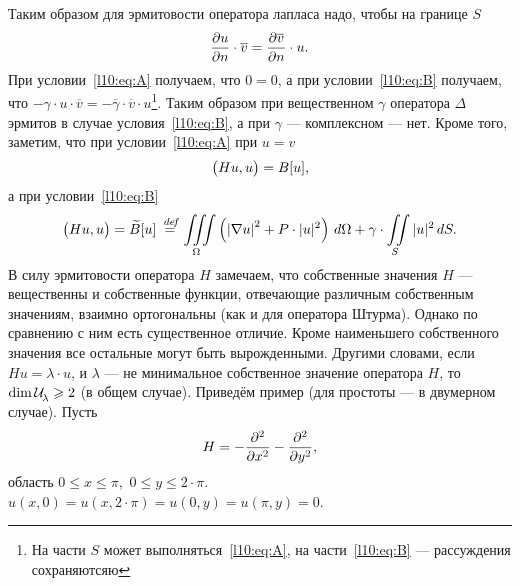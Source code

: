 Таким образом для эрмитовости оператора лапласа надо, чтобы на границе $S$
\begin{equation*}
	\hfill\pder{u}{n}\cdot\overline{v}=\pder{\overline{v}}{n}\cdot u.\hfill
\end{equation*}
При условии~\eqref{l10:eq:A} получаем, что $0=0$, а при условии~\eqref{l10:eq:B} получаем, что $-\gamma\cdot u\cdot\overline{v}=-\overline{\gamma}\cdot\overline{v}\cdot u$\footnote{На части $S$ может выполняться~\eqref{l10:eq:A}, на части~\eqref{l10:eq:B} --- рассуждения сохраняютсяю}. Таким образом при вещественном $\gamma$ оператора $\Delta$ эрмитов в случае условия~\eqref{l10:eq:B}, а при $\gamma$ --- комплексном --- нет. Кроме того, заметим, что при условии~\eqref{l10:eq:A} при $u=v$
\begin{equation}\label{l10:eq:7}
	\hfill\big(Hu,u\big)=B[u],\hfill
\end{equation} 
а при условии~\eqref{l10:eq:B}
\begin{equation}\label{l10:eq:8}
	\hfill\big(Hu,u\big)=\widetilde{B}[u]\eqdef\iiint\limits_{\Omega}\left(\left|\nabla u\right|^2+P\cdot|u|^2\right)\,d\Omega+\gamma\cdot\iint\limits_{S}|u|^2\,dS.\hfill
\end{equation}
В силу эрмитовости оператора $H$ замечаем, что собственные значения $H$ --- вещественны и собственные функции, отвечающие различным собственным значениям, взаимно ортогональны (как и для оператора Штурма). Однако по сравнению с ним есть существенное отличие. Кроме наименьшего собственного значения все остальные могут быть вырожденными. Другими словами, если $Hu=\lambda\cdot u$, и $\lambda$ --- не минимальное собственное значение оператора $H$, то $\dim\mathcal{U}\!{\mathstrut}_{\lambda}\geqslant2$ (в общем случае). Приведём пример (для простоты --- в двумерном случае). Пусть
\begin{equation*}
	\hfill H=-\pdder{}{x}-\pdder{}{y},\hfill
\end{equation*}
область $0\leqslant x\leqslant\pi$,\ $0\leqslant y\leqslant 2\cdot\pi$. $u(x,0)=u(x,2\cdot\pi)=u(0,y)=u(\pi,y)=0$.



